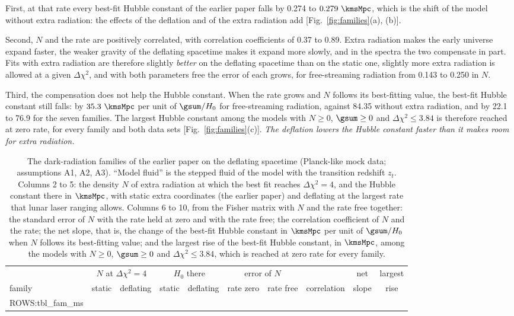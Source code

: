 First, at that rate every best-fit Hubble constant of the earlier paper falls by 0.274 to
$0.279~\kmsMpc$, which is the shift of the model without extra radiation: the effects of the
deflation and of the extra radiation add [Fig.~\ref{fig:families}(a), (b)].

Second, $N$ and the rate are positively correlated, with correlation coefficients of 0.37 to 0.89.
Extra radiation makes the early universe expand faster, the weaker gravity of the deflating
spacetime makes it expand more slowly, and in the spectra the two compensate in part. Fits with
extra radiation are therefore slightly \emph{better} on the deflating spacetime than on the static
one, slightly more extra radiation is allowed at a given $\Delta\chi^{2}$, and with both parameters
free the error of each grows, for free-streaming radiation from 0.143 to 0.250 in $N$.

Third, the compensation does not help the Hubble constant. When the rate grows and $N$ follows its
best-fitting value, the best-fit Hubble constant still falls: by $35.3~\kmsMpc$ per unit of
$\gsum/H_0$ for free-streaming radiation, against 84.35 without extra radiation, and by 22.1 to 76.9
for the seven families. The largest Hubble constant among the models with $N\ge0$, $\gsum\ge0$ and
$\Delta\chi^{2}\le3.84$ is therefore reached at zero rate, for every family and both data sets
[Fig.~\ref{fig:families}(c)]. \emph{The deflation lowers the Hubble constant faster than it makes
room for extra radiation.}

\begin{table}
\caption{\label{tab:families}The dark-radiation families of the earlier paper on the deflating
spacetime (Planck-like mock data; assumptions A1, A2, A3). ``Model fluid'' is the stepped fluid of
the model with the transition redshift $z_t$. Columns 2 to 5: the density $N$ of extra
radiation at which the best fit reaches $\Delta\chi^{2}=4$, and the Hubble constant there in
$\kmsMpc$, with static extra coordinates (the earlier paper) and deflating at the largest rate that
lunar laser ranging allows. Columns 6 to 10, from the Fisher matrix with $N$ and the rate free together: the standard
error of $N$ with the rate held at zero and with the rate free; the correlation coefficient of $N$
and the rate; the net slope, that is, the change of the best-fit Hubble constant in $\kmsMpc$ per
unit of $\gsum/H_0$ when $N$ follows its best-fitting value; and the largest rise of the best-fit
Hubble constant, in $\kmsMpc$, among the models with $N\ge0$, $\gsum\ge0$ and
$\Delta\chi^{2}\le3.84$, which is reached at zero rate for every family.}
\begin{ruledtabular}
\begin{tabular}{lccccccccc}
 & \multicolumn{2}{c}{$N$ at $\Delta\chi^{2}=4$} & \multicolumn{2}{c}{$H_0$ there} & \multicolumn{2}{c}{error of $N$} & & net & largest \\
family & static & deflating & static & deflating & rate zero & rate free & correlation & slope & rise \\
\hline
{{ROWS:tbl_fam_ms}}
\end{tabular}
\end{ruledtabular}
\end{table}

